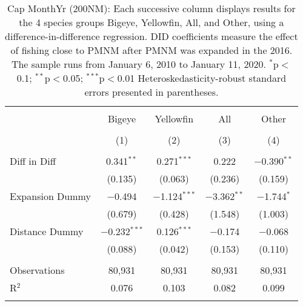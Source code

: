 
\begin{table}[!htbp] \centering 
  \caption{Cap MonthYr (200NM): Each successive column displays results for the 4 species groups Bigeye, Yellowfin, All, and Other, using a difference-in-difference regression. DID coefficients measure the effect of fishing close to PMNM after PMNM was expanded in the 2016. The sample runs from January 6, 2010 to January 11, 2020. $^{*}$p$<$0.1; $^{**}$p$<$0.05; $^{***}$p$<$0.01 Heteroskedasticity-robust standard errors presented in parentheses.} 
  \label{tbl:timeFE200NM} 
\begin{tabular}{@{\extracolsep{5pt}}lcccc} 
\\[-1.8ex]\hline 
\hline \\[-1.8ex] 
 & Bigeye & Yellowfin & All & Other \\ 
\\[-1.8ex] & (1) & (2) & (3) & (4)\\ 
\hline \\[-1.8ex] 
 Diff in Diff & 0.341$^{**}$ & 0.271$^{***}$ & 0.222 & $-$0.390$^{**}$ \\ 
  & (0.135) & (0.063) & (0.236) & (0.159) \\ 
  Expansion Dummy & $-$0.494 & $-$1.124$^{***}$ & $-$3.362$^{**}$ & $-$1.744$^{*}$ \\ 
  & (0.679) & (0.428) & (1.548) & (1.003) \\ 
  Distance Dummy & $-$0.232$^{***}$ & 0.126$^{***}$ & $-$0.174 & $-$0.068 \\ 
  & (0.088) & (0.042) & (0.153) & (0.110) \\ 
 \hline \\[-1.8ex] 
Observations & 80,931 & 80,931 & 80,931 & 80,931 \\ 
R$^{2}$ & 0.076 & 0.103 & 0.082 & 0.099 \\ 
\hline 
\hline \\[-1.8ex] 
\end{tabular} 
\end{table} 
